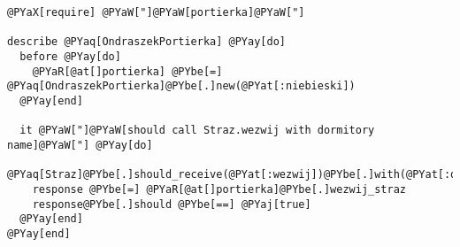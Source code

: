\begin{Verbatim}[commandchars=@\[\]]
@PYaX[require] @PYaW["]@PYaW[portierka]@PYaW["]

describe @PYaq[OndraszekPortierka] @PYay[do]
  before @PYay[do]
    @PYaR[@at[]portierka] @PYbe[=] @PYaq[OndraszekPortierka]@PYbe[.]new(@PYat[:niebieski])
  @PYay[end]

  it @PYaW["]@PYaW[should call Straz.wezwij with dormitory name]@PYaW["] @PYay[do]
    @PYaq[Straz]@PYbe[.]should_receive(@PYat[:wezwij])@PYbe[.]with(@PYat[:ondraszek])@PYbe[.]and_return(@PYaj[true])
    response @PYbe[=] @PYaR[@at[]portierka]@PYbe[.]wezwij_straz
    response@PYbe[.]should @PYbe[==] @PYaj[true]
  @PYay[end]
@PYay[end]
\end{Verbatim}
